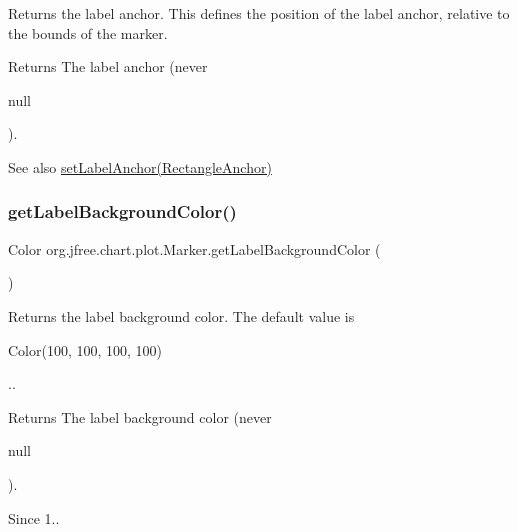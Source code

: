 Returns the label anchor. This defines the position of the label anchor, relative to the bounds of the marker.

\begin{DoxyReturn}{Returns}
The label anchor (never
\begin{DoxyCode}
null 
\end{DoxyCode}
 ).
\end{DoxyReturn}
\begin{DoxySeeAlso}{See also}
\mbox{\hyperlink{classorg_1_1jfree_1_1chart_1_1plot_1_1_marker_a999115c5675ccdc061311b8f9906c0ac}{set\+Label\+Anchor(\+Rectangle\+Anchor)}} 
\end{DoxySeeAlso}
\mbox{\label{classorg_1_1jfree_1_1chart_1_1plot_1_1_marker_a98fd3a2dd65ad47d2d8d6ee3142cb2cc}} 
\subsubsection{\texorpdfstring{get\+Label\+Background\+Color()}{getLabelBackgroundColor()}}
{\footnotesize\ttfamily Color org.\+jfree.\+chart.\+plot.\+Marker.\+get\+Label\+Background\+Color (\begin{DoxyParamCaption}{ }\end{DoxyParamCaption})}

Returns the label background color. The default value is 
\begin{DoxyCode}
Color(100, 100, 100, 100) 
\end{DoxyCode}
 ..

\begin{DoxyReturn}{Returns}
The label background color (never
\begin{DoxyCode}
null 
\end{DoxyCode}
 ).
\end{DoxyReturn}
\begin{DoxySince}{Since}
1.. 
\end{DoxySince}
\mbox{\label{classorg_1_1jfree_1_1chart_1_1plot_1_1_marker_a917624a7c9cd70529447d3db29ccb9cc}} 
